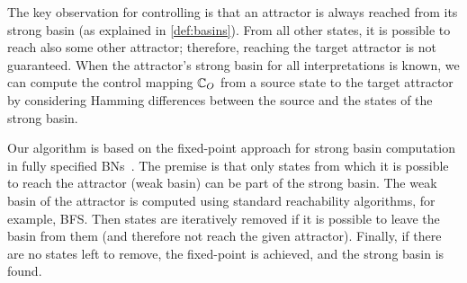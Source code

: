 
\begin{algorithm}
  \caption{Computation of attractor interpretations $\interpretationSet_A(\var{t})$.}
  \label{algo:attractor-params}
\end{algorithm}


The key observation for controlling  is that an attractor is always reached from its strong basin (as explained in \autoref{def:basins}). From all other states, it is possible to reach also some other attractor; therefore, reaching the target attractor is not guaranteed. When the attractor's strong basin for all interpretations is known, we can compute the control mapping $\mathbb{C}_O$ from a source state to the target attractor by considering Hamming differences between the source and the states of the strong basin. 

Our algorithm is based on the fixed-point approach for strong basin computation in fully specified BNs~\cite{Paul2018CMSB}. The premise is that only states from which it is possible to reach the attractor (weak basin) can be part of the strong basin. The weak basin of the attractor is computed using standard reachability algorithms, for example, BFS. Then states are iteratively removed if it is possible to leave the basin from them (and therefore not reach the given attractor). Finally, if there are no states left to remove, the fixed-point is achieved, and the strong basin is found.


